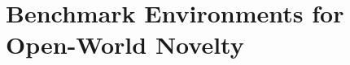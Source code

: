 \chapter[Benchmark Environments for Open Worlds]{Benchmark Environments for Open-World Novelty}
\label{ch:benchmarks}







